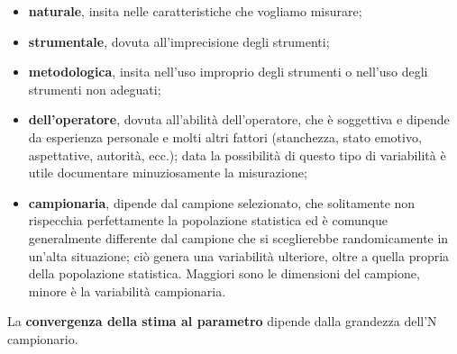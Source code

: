 \documentclass[10pt, draft]{book}
\newcommand{\tightlist}{%
\setlength{\itemsep}{1pt}\setlength{\parskip}{0pt}\setlength{\parsep}{0pt}}
\begin{document}
\begin{itemize} \tightlist
    \item \textbf{naturale}, insita nelle caratteristiche che vogliamo misurare; 
    \item \textbf{strumentale}, dovuta all'imprecisione degli strumenti; 
    \item \textbf{metodologica}, insita nell'uso improprio degli strumenti o nell'uso degli strumenti non adeguati; 
    \item \textbf{dell'operatore}, dovuta all'abilità dell'operatore, che è soggettiva e dipende da esperienza personale e molti altri fattori (stanchezza, stato emotivo, aspettative, autorità, ecc.); data la possibilità di questo tipo di variabilità è utile documentare minuziosamente la misurazione;
    \item \textbf{campionaria}, dipende dal campione selezionato, che solitamente non rispecchia perfettamente la popolazione statistica ed è comunque generalmente differente dal campione che si sceglierebbe randomicamente in un'alta situazione; ciò genera una variabilità ulteriore, oltre a quella propria della popolazione statistica. Maggiori sono le dimensioni del campione, minore è la variabilità campionaria.
\end{itemize}
La \textbf{convergenza della stima al parametro} dipende dalla grandezza dell'N campionario.
\end{document}
